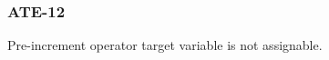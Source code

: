 \subsubsection{ATE-12}\label{sec:error_code_ate_12}

Pre-increment operator target variable is not assignable.


